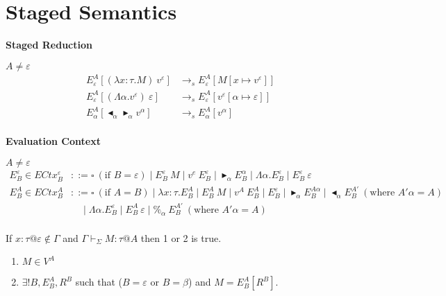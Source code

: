 \documentclass[9pt, a4paper]{extarticle}
\theoremstyle{break}
\newcommand{\figheader}[2]{
  \begin{flushleft}
    #2 {\bf \normalsize #1}
\end{flushleft}}
\newcommand{\G}{\Gamma}
\newcommand{\V}{\vdash_\Sigma}
\newcommand{\TB}{\blacktriangleright}
\newcommand{\TBL}{\blacktriangleleft}
\begin{document}
\section{ Staged Semantics }

\figheader{Staged Reduction}{}
$A \neq \varepsilon$\\
\begin{align*}
	E^A_\varepsilon [(\lambda x:\tau.M)\ v^\varepsilon]          & \longrightarrow_s E^A_\varepsilon[M[x\mapsto v^\varepsilon]]                \\
	E^A_\varepsilon [(\Lambda\alpha.v^\varepsilon)\ \varepsilon] & \longrightarrow_s E^A_\varepsilon[v^\varepsilon[\alpha\mapsto \varepsilon]] \\
	E^A_\alpha [\TBL_\alpha \TB_\alpha v^\alpha]                 & \longrightarrow_s E^A_\alpha[v^\alpha]                                      \\
\end{align*}

\figheader{Evaluation Context}{}
$A \neq \varepsilon$\\
\begin{align*}
	E^\varepsilon_B \in ECtx^\varepsilon_B & ::= \square\ (\text{if\ } B = \varepsilon) \mid E^\varepsilon_B\ M \mid v^e\ E^\varepsilon_B
	\mid \TB_\alpha E^\alpha_B \mid \Lambda\alpha.E^\varepsilon_B
	\mid E^\varepsilon_B\ \varepsilon                                                                                                     \\
	E^A_B \in ECtx^A_B                     & ::= \square\ (\text{if } A = B) \mid \lambda x:\tau.E^A_B \mid E^A_B\ M \mid v^A\ E^A_B
	\mid E^\varepsilon_B \mid \TB_\alpha E^{A\alpha}_B
	\mid \TBL_\alpha E^{A'}_B \ (\text{where } A'\alpha = A)                                                                              \\
	                                       & \quad \mid \Lambda\alpha.E^\varepsilon_B
	\mid E^A_B\ \varepsilon \mid \%_\alpha\ E^{A'}_B \ (\text{where } A'\alpha = A)                                                       \\
\end{align*}

\begin{thm}
	If $x:\tau@\varepsilon \notin \G$ and $\G \V M : \tau @ A$ then 1 or 2 is true.
	\begin{enumerate}
		\item $ M \in V^A$
		\item $\exists ! B, E^A_B, R^B$ such that ($B = \varepsilon$ or $B = \beta$) and $M = E^A_B[R^B]$.
	\end{enumerate}
\end{thm}
\end{document}
